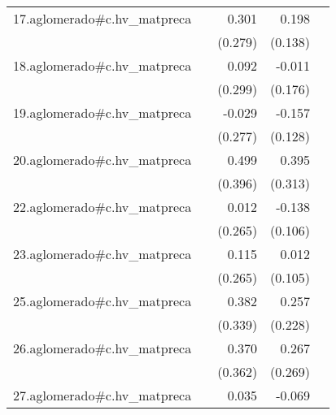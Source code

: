 {\begin{longtable}{l*{4}{D{.}{.}{-1}}}
\addlinespace
17.aglomerado#c.hv\_matpreca&                     &       0.301         &       0.198         &                     \\
            &                     &     (0.279)         &     (0.138)         &                     \\
\addlinespace
18.aglomerado#c.hv\_matpreca&                     &       0.092         &      -0.011         &                     \\
            &                     &     (0.299)         &     (0.176)         &                     \\
\addlinespace
19.aglomerado#c.hv\_matpreca&                     &      -0.029         &      -0.157         &                     \\
            &                     &     (0.277)         &     (0.128)         &                     \\
\addlinespace
20.aglomerado#c.hv\_matpreca&                     &       0.499         &       0.395         &                     \\
            &                     &     (0.396)         &     (0.313)         &                     \\
\addlinespace
22.aglomerado#c.hv\_matpreca&                     &       0.012         &      -0.138         &                     \\
            &                     &     (0.265)         &     (0.106)         &                     \\
\addlinespace
23.aglomerado#c.hv\_matpreca&                     &       0.115         &       0.012         &                     \\
            &                     &     (0.265)         &     (0.105)         &                     \\
\addlinespace
25.aglomerado#c.hv\_matpreca&                     &       0.382         &       0.257         &                     \\
            &                     &     (0.339)         &     (0.228)         &                     \\
\addlinespace
26.aglomerado#c.hv\_matpreca&                     &       0.370         &       0.267         &                     \\
            &                     &     (0.362)         &     (0.269)         &                     \\
\addlinespace
27.aglomerado#c.hv\_matpreca&                     &       0.035         &      -0.069         &                     \\

\end{longtable}}
